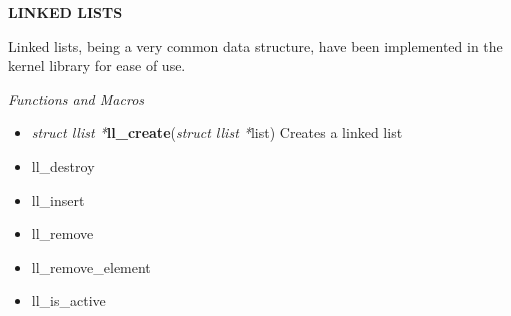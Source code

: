 \documentclass[a4paper]{article}
\begin{document}
\begin{noindent}
\begin{center}
\textbf{LINKED LISTS}
\end{center}

Linked lists, being a very common data structure, have been implemented
in the kernel library for ease of use. 


\textit{Functions and Macros}

\begin{itemize}
\item \textit{struct llist *}\textbf{ll\_create}(\textit{struct llist *}list)
	Creates a linked list
\item ll\_destroy
\item ll\_insert
\item ll\_remove
\item ll\_remove\_element
\item ll\_is\_active
\end{itemize}



\end{noindent}
\end{document}
